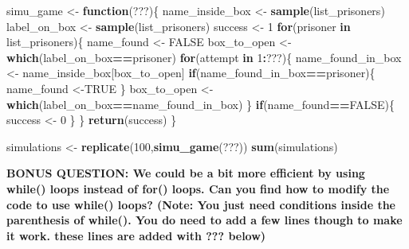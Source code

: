 \documentclass[]{book}
\newenvironment{Shaded}{\begin{snugshade}}{\end{snugshade}}
\newcommand{\ControlFlowTok}[1]{\textcolor[rgb]{0.13,0.29,0.53}{\textbf{#1}}}
\newcommand{\DecValTok}[1]{\textcolor[rgb]{0.00,0.00,0.81}{#1}}
\newcommand{\KeywordTok}[1]{\textcolor[rgb]{0.13,0.29,0.53}{\textbf{#1}}}
\newcommand{\NormalTok}[1]{#1}
\newcommand{\OperatorTok}[1]{\textcolor[rgb]{0.81,0.36,0.00}{\textbf{#1}}}
\newcommand{\OtherTok}[1]{\textcolor[rgb]{0.56,0.35,0.01}{#1}}
\newcommand{\StringTok}[1]{\textcolor[rgb]{0.31,0.60,0.02}{#1}}
\begin{document}
\begin{Shaded}
\begin{Highlighting}[]
\NormalTok{simu_game <-}\StringTok{ }\ControlFlowTok{function}\NormalTok{(???)\{}
\NormalTok{  name_inside_box <-}\StringTok{ }\KeywordTok{sample}\NormalTok{(list_prisoners)}
\NormalTok{  label_on_box <-}\StringTok{ }\KeywordTok{sample}\NormalTok{(list_prisoners)}
\NormalTok{  success <-}\StringTok{ }\DecValTok{1}
  \ControlFlowTok{for}\NormalTok{(prisoner }\ControlFlowTok{in}\NormalTok{ list_prisoners)\{}
\NormalTok{    name_found <-}\StringTok{ }\OtherTok{FALSE}
\NormalTok{    box_to_open <-}\StringTok{ }\KeywordTok{which}\NormalTok{(label_on_box}\OperatorTok{==}\NormalTok{prisoner)}
    \ControlFlowTok{for}\NormalTok{(attempt }\ControlFlowTok{in} \DecValTok{1}\OperatorTok{:}\NormalTok{???)\{}
\NormalTok{      name_found_in_box <-}\StringTok{ }\NormalTok{name_inside_box[box_to_open]}
      \ControlFlowTok{if}\NormalTok{(name_found_in_box}\OperatorTok{==}\NormalTok{prisoner)\{}
\NormalTok{        name_found <-}\OtherTok{TRUE}
\NormalTok{      \}}
\NormalTok{      box_to_open <-}\StringTok{ }\KeywordTok{which}\NormalTok{(label_on_box}\OperatorTok{==}\NormalTok{name_found_in_box) }
\NormalTok{    \}}
    \ControlFlowTok{if}\NormalTok{(name_found}\OperatorTok{==}\OtherTok{FALSE}\NormalTok{)\{}
\NormalTok{      success <-}\StringTok{ }\DecValTok{0}
\NormalTok{    \}}
\NormalTok{  \}}
  \KeywordTok{return}\NormalTok{(success)}
\NormalTok{\}}

\NormalTok{simulations <-}\StringTok{ }\KeywordTok{replicate}\NormalTok{(}\DecValTok{100}\NormalTok{,}\KeywordTok{simu_game}\NormalTok{(???))}
\KeywordTok{sum}\NormalTok{(simulations)}
\end{Highlighting}
\end{Shaded}

\textbf{BONUS QUESTION: We could be a bit more efficient by using while() loops instead of for() loops. Can you find how to modify the code to use while() loops? (Note: You just need conditions inside the parenthesis of while(). You do need to add a few lines though to make it work. these lines are added with ??? below)}
\end{document}
